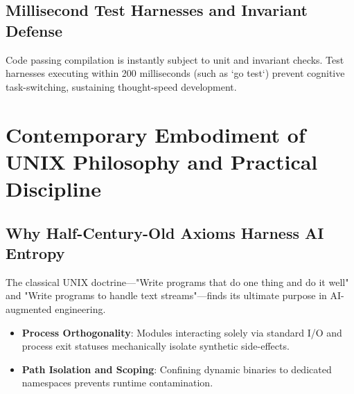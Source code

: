 \documentclass[11pt,a4paper,openany]{book}
\newif\ifja
\begin{document}
  \section{Millisecond Test Harnesses and Invariant Defense}
  Code passing compilation is instantly subject to unit and invariant checks.
  Test harnesses executing within 200 milliseconds (such as `go test`) prevent cognitive task-switching, sustaining thought-speed development.
\fi

\ifja
  \chapter{UNIX哲学の現代的具現と実践的規律}
  \section{半世紀前の原則がAIの手綱となる理由}
  UNIXの伝統的な教義――「1つのことを巧みにこなすプログラムを書け」「標準ストリームを通じて連携させよ」――は、現代のAI協調開発において真価を発揮する。

  \begin{itemize}
    \item \textbf{プロセスの直交性}: 各モジュールが標準入出力と明確なプロセス終了ステータスを持つことで、AI生成モジュール同士の干渉が物理的に遮断される。
    \item \textbf{Path Isolation と最小権限}: 専用ディレクトリ（例: \texttt{\textasciitilde/.local/share/ssh-to/machines}）に隔離することで、AI生成ツールが既存環境を破壊するリスクを予防する。
  \end{itemize}
\else
  \chapter{Contemporary Embodiment of UNIX Philosophy and Practical Discipline}
  \section{Why Half-Century-Old Axioms Harness AI Entropy}
  The classical UNIX doctrine—"Write programs that do one thing and do it well" and "Write programs to handle text streams"—finds its ultimate purpose in AI-augmented engineering.

  \begin{itemize}
    \item \textbf{Process Orthogonality}: Modules interacting solely via standard I/O and process exit statuses mechanically isolate synthetic side-effects.
    \item \textbf{Path Isolation and Scoping}: Confining dynamic binaries to dedicated namespaces prevents runtime contamination.
  \end{itemize}
\fi
\end{document}
